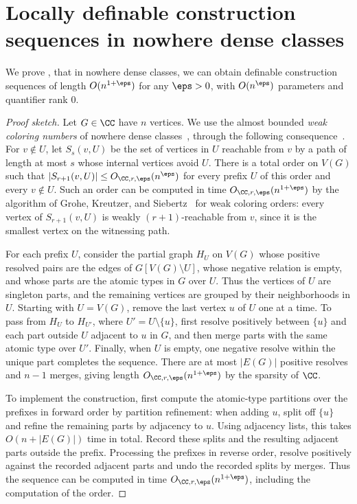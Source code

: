 \section{Locally definable construction sequences in nowhere dense classes}\label{sec:nd}
We prove , that in nowhere dense classes, we can obtain definable construction sequences of length $O(n^{1+\eps})$ for any $\eps>0$, with $O(n^\eps)$ parameters and quantifier rank $0$.

\thmnddefseq*

\begin{proof}[Proof sketch]
Let $G\in\CC$ have $n$ vertices.
We use the almost bounded \emph{weak coloring numbers} of nowhere dense classes~\cite{NesetrilM11a,gks}, through the following consequence~\cite{drabik2026flips}.
For $v\notin U$, let $S_s(v,U)$ be the set of vertices in $U$ reachable from $v$ by a path of length at most $s$ whose internal vertices avoid $U$.
There is a total order on $V(G)$ such that $|S_{r+1}(v,U)|\le O_{\CC,r,\eps}(n^\eps)$ for every prefix $U$ of this order and every $v\notin U$.
Such an order can be computed in time $O_{\CC,r,\eps}(n^{1+\eps})$ by the algorithm of Grohe, Kreutzer, and Siebertz~\cite{gks} for weak coloring orders: every vertex of $S_{r+1}(v,U)$ is weakly $(r+1)$-reachable from $v$, since it is the smallest vertex on the witnessing path.

For each prefix $U$, consider the partial graph $H_U$ on $V(G)$ whose positive resolved pairs are the edges of $G[V(G)\setminus U]$, whose negative relation is empty, and whose parts are the atomic types in $G$ over $U$.
Thus the vertices of $U$ are singleton parts, and the remaining vertices are grouped by their neighborhoods in $U$.
Starting with $U=V(G)$, remove the last vertex $u$ of $U$ one at a time.
To pass from $H_U$ to $H_{U'}$, where $U'=U\setminus\{u\}$, first resolve positively between $\{u\}$ and each part outside $U$ adjacent to $u$ in $G$, and then merge parts with the same atomic type over $U'$.
Finally, when $U$ is empty, one negative resolve within the unique part completes the sequence.
There are at most $|E(G)|$ positive resolves and $n-1$ merges, giving length $O_{\CC,r,\eps}(n^{1+\eps})$ by the sparsity of $\CC$.

To implement the construction, first compute the atomic-type partitions over the prefixes in forward order by partition refinement: when adding $u$, split off $\{u\}$ and refine the remaining parts by adjacency to $u$.
Using adjacency lists, this takes $O(n+|E(G)|)$ time in total.
Record these splits and the resulting adjacent parts outside the prefix.
Processing the prefixes in reverse order, resolve positively against the recorded adjacent parts and undo the recorded splits by merges.
Thus the sequence can be computed in time $O_{\CC,r,\eps}(n^{1+\eps})$, including the computation of the order.


\end{proof}
